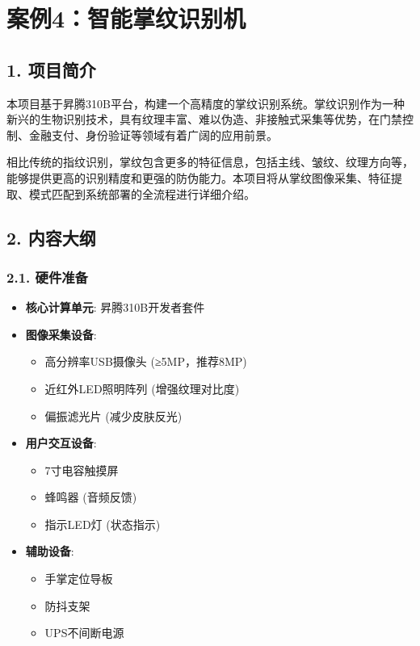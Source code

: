\chapter{案例4：智能掌纹识别机}\label{ux6848ux4f8b4ux667aux80fdux638cux7eb9ux8bc6ux522bux673a}

\section{1. 项目简介}\label{ux9879ux76eeux7b80ux4ecb}

本项目基于昇腾310B平台，构建一个高精度的掌纹识别系统。掌纹识别作为一种新兴的生物识别技术，具有纹理丰富、难以伪造、非接触式采集等优势，在门禁控制、金融支付、身份验证等领域有着广阔的应用前景。

相比传统的指纹识别，掌纹包含更多的特征信息，包括主线、皱纹、纹理方向等，能够提供更高的识别精度和更强的防伪能力。本项目将从掌纹图像采集、特征提取、模式匹配到系统部署的全流程进行详细介绍。

\section{2. 内容大纲}\label{ux5185ux5bb9ux5927ux7eb2}

\subsection{2.1. 硬件准备}\label{ux786cux4ef6ux51c6ux5907}

\begin{itemize}
\tightlist
\item
  \textbf{核心计算单元}: 昇腾310B开发者套件
\item
  \textbf{图像采集设备}:

  \begin{itemize}
  \tightlist
  \item
    高分辨率USB摄像头 (≥5MP，推荐8MP)
  \item
    近红外LED照明阵列 (增强纹理对比度)
  \item
    偏振滤光片 (减少皮肤反光)
  \end{itemize}
\item
  \textbf{用户交互设备}:

  \begin{itemize}
  \tightlist
  \item
    7寸电容触摸屏
  \item
    蜂鸣器 (音频反馈)
  \item
    指示LED灯 (状态指示)
  \end{itemize}
\item
  \textbf{辅助设备}:

  \begin{itemize}
  \tightlist
  \item
    手掌定位导板
  \item
    防抖支架
  \item
    UPS不间断电源
  \end{itemize}
\end{itemize}

